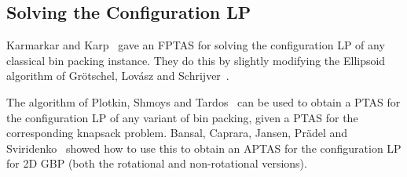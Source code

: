 \subsection{Solving the Configuration LP}

Karmarkar and Karp~\cite{karmarkar-karp} gave an FPTAS for solving the configuration LP
of any classical bin packing instance.
They do this by slightly modifying the Ellipsoid algorithm of
Gr\"otschel, Lov\'asz and Schrijver~\cite{gls-ellipsoid}.

The algorithm of Plotkin, Shmoys and Tardos~\cite{plotkin1995fast} can be used to
obtain a PTAS for the configuration LP of any variant of bin packing,
given a PTAS for the corresponding knapsack problem.
Bansal, Caprara, Jansen, Pr\"adel and Sviridenko~\cite{bansal2009structural}
showed how to use this to obtain an APTAS for the configuration LP for 2D GBP
(both the rotational and non-rotational versions).
